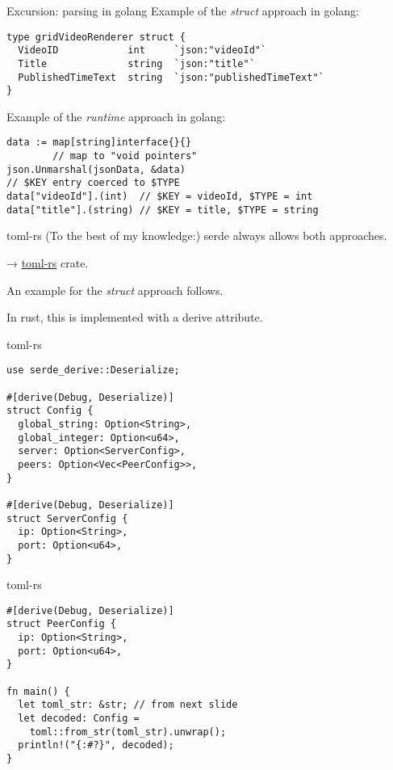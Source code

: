 \documentclass{beamer}
\begin{document}
\begin{frame}[fragile]{Excursion: parsing in golang}
  Example of the \emph{struct} approach in golang:
  \begin{verbatim}
type gridVideoRenderer struct {
  VideoID            int     `json:"videoId"`
  Title              string  `json:"title"`
  PublishedTimeText  string  `json:"publishedTimeText"`
}
  \end{verbatim}
  Example of the \emph{runtime} approach in golang:
  \begin{verbatim}
data := map[string]interface{}{}
        // map to "void pointers"
json.Unmarshal(jsonData, &data)
// $KEY entry coerced to $TYPE
data["videoId"].(int)  // $KEY = videoId, $TYPE = int
data["title"].(string) // $KEY = title, $TYPE = string
  \end{verbatim}
\end{frame}

\begin{frame}[fragile]{toml-rs}
  (To the best of my knowledge:) serde always allows both approaches.

  → \href{https://github.com/alexcrichton/toml-rs}{toml-rs} crate.

  An example for the \emph{struct} approach follows.

  In rust, this is implemented with a derive attribute.
\end{frame}

\begin{frame}[fragile]{toml-rs}
  \begin{verbatim}
use serde_derive::Deserialize;

#[derive(Debug, Deserialize)]
struct Config {
  global_string: Option<String>,
  global_integer: Option<u64>,
  server: Option<ServerConfig>,
  peers: Option<Vec<PeerConfig>>,
}

#[derive(Debug, Deserialize)]
struct ServerConfig {
  ip: Option<String>,
  port: Option<u64>,
}
  \end{verbatim}
\end{frame}

\begin{frame}[fragile]{toml-rs}
  \begin{verbatim}
#[derive(Debug, Deserialize)]
struct PeerConfig {
  ip: Option<String>,
  port: Option<u64>,
}

fn main() {
  let toml_str: &str; // from next slide
  let decoded: Config =
    toml::from_str(toml_str).unwrap();
  println!("{:#?}", decoded);
}
  \end{verbatim}
\end{frame}
\end{document}
